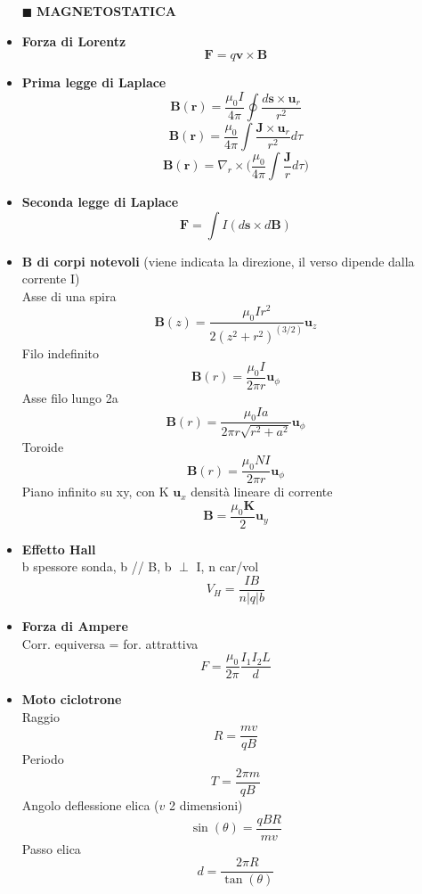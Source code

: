 \documentclass{book}
\newcommand{\g}{\textbf}
\newcommand{\h}{\mathbf}
\newcommand{\e}{\begin{equation}}
\newcommand{\ex}{\end{equation} }
\renewcommand{\it}{\item[$\cdot$]}
\begin{document}
\begin{multicols*}{4}
\begin{itemize}
\item [$\blacksquare$] \g{MAGNETOSTATICA}
    \it \g{Forza di Lorentz}
        \e{\h{F}=q\h{v}\times\h{B}}\ex
    \it \g{Prima legge di Laplace}
        \e{\h{B}(\h{r})=\frac{\mu_0 I}{4\pi}\oint\frac{d\h{s}\times\h{u}_r}{r^2}} \ex
        \e{\h{B}(\h{r})=\frac{\mu_0}{4\pi}\int\frac{\h{J}\times\h{u}_r}{r^2} d\tau} \ex
        \e{\h{B}(\h{r})=\nabla_r\times\biggl(\frac{\mu_0}{4\pi}\int\frac{\h{J}}{r}d\tau\biggr)} \ex
    \it \g{Seconda legge di Laplace}
        \e{\h{F}=\int I(d\h{s}\times d\h{B})} \ex
    \it \g{B di corpi notevoli} (viene indicata la direzione, il verso dipende dalla corrente I) \\
        Asse di una spira
        \e{\h{B}(z)=\frac{\mu_0Ir^2}{2(z^2+r^2)^(3/2)}\h{u}_z} \ex
        Filo indefinito
        \e{\h{B}(r)=\frac{\mu_0I}{2\pi r}\h{u}_\phi} \ex
        Asse filo lungo 2a
        \e{\h{B}(r)=\frac{\mu_0Ia}{2\pi r \sqrt{r^2+a^2}}\h{u}_\phi} \ex
        Toroide
        \e{\h{B}(r)=\frac{\mu_0NI}{2\pi r}\h{u}_\phi} \ex
        Piano infinito su xy, con K $\h{u}_{x}$ densità lineare di corrente
        \e{\h{B}=\frac{\mu_0 \h{K}}{2}\h{u}_y} \ex
    \it \g{Effetto Hall} \\
        b spessore sonda, b // B, b $\perp$ I, n car/vol
        \e{V_H=\frac{IB}{n|q|b}} \ex
    \it \g{Forza di Ampere} \\
        Corr. equiversa = for. attrattiva 
        \e{F = \frac{\mu_0}{2\pi} \frac{I_1 I_2 L}{d}}\ex
    \it \g{Moto ciclotrone} \\
        Raggio
        \e{R = \frac{mv}{qB}}\ex 
        Periodo 
        \e{T = \frac{2\pi m}{qB}}\ex 
        Angolo deflessione elica ($v$ 2 dimensioni) 
        \e{\sin(\theta) = \frac{qBR}{mv}}\ex 
        Passo elica 
        \e{d=\frac{2\pi R}{\tan(\theta)}} \ex


\end{itemize}
\end{multicols*}
\end{document}
